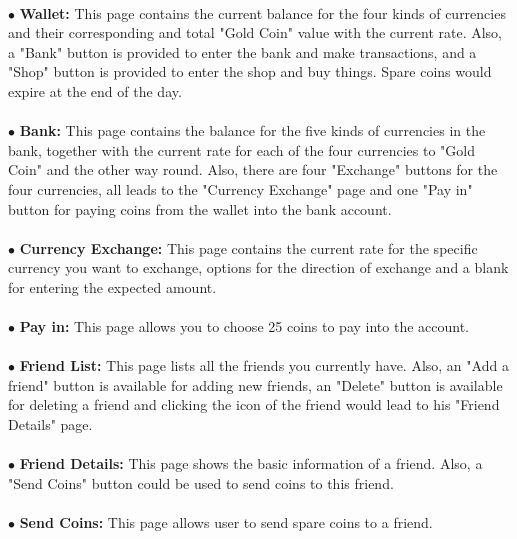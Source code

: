 \documentclass[paper=a4, fontsize=11pt]{scrartcl} %
\begin{document}
\paragraph{}$\bullet$ \textbf{Wallet: } This page contains the current balance for the four kinds of currencies and their corresponding and total "Gold Coin" value with the current rate. Also, a "Bank" button is provided to enter the bank and make transactions, and a "Shop" button is provided to enter the shop and buy things. Spare coins would expire at the end of the day.
\paragraph{}$\bullet$ \textbf{Bank: } This page contains the balance for the five kinds of currencies in the bank, together with the current rate for each of the four currencies to "Gold Coin" and the other way round. Also, there are four "Exchange" buttons for the four currencies, all leads to the "Currency Exchange" page and one "Pay in" button for paying coins from the wallet into the bank account.
\paragraph{}$\bullet$ \textbf{Currency Exchange: } This page contains the current rate for the specific currency you want to exchange, options for the direction of exchange and a blank for  entering the expected amount.
\paragraph{}$\bullet$ \textbf{Pay in: } This page allows you to choose 25 coins to pay into the account.
\paragraph{}$\bullet$ \textbf{Friend List: } This page lists all the friends you currently have. Also, an "Add a friend" button is available for adding new friends, an "Delete" button is available for deleting a friend and clicking the icon of the friend would lead to his "Friend Details" page.
\paragraph{}$\bullet$ \textbf{Friend Details: } This page shows the basic information of a friend. Also, a "Send Coins" button could be used to send coins to this friend.
\paragraph{}$\bullet$ \textbf{Send Coins: } This page allows user to send spare coins to a friend.
\end{document}
